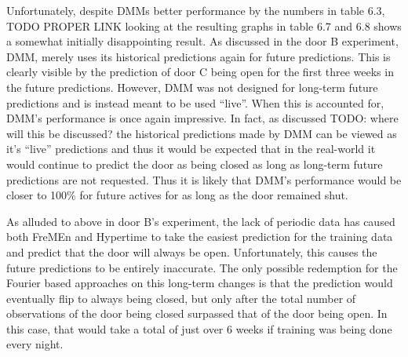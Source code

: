 Unfortunately, despite DMMs better performance by the numbers in table 6.3, TODO PROPER LINK
looking at the resulting graphs in table 6.7 and 6.8 shows a somewhat
initially disappointing result. As discussed in the door B experiment,
DMM, merely uses its historical predictions again for future
predictions. This is clearly visible by the prediction of door C being open
for the first three weeks in the future predictions. However, DMM was not
designed for long-term future predictions and is instead meant to be used
``live''. When this is accounted for, DMM's performance is once again
impressive. In fact, as discussed TODO: where will this be discussed? the
historical predictions made by DMM can be viewed as it's ``live''
predictions and thus it would be expected that in the real-world it would
continue to predict the door as being closed as long as long-term future
predictions are not requested. Thus it is likely that DMM's
performance would be closer to 100\% for future actives for as long as the door
remained shut. \\

\begin{table}[h!]
  \centering

  \caption{Door C Data Overview}
\end{table}

As alluded to above in door B's experiment, the lack of periodic data has
caused both FreMEn and Hypertime to take the easiest prediction for the
training data and predict that the door will always be open. Unfortunately,
this causes the future predictions to be entirely inaccurate. The only possible redemption
for the Fourier based approaches on this long-term changes is that the
prediction would eventually flip to always being closed, but only after the total number of observations of the door being
closed surpassed that of the door being open. In this case, that would take a
total of just over 6 weeks if training was being done every night. \\

